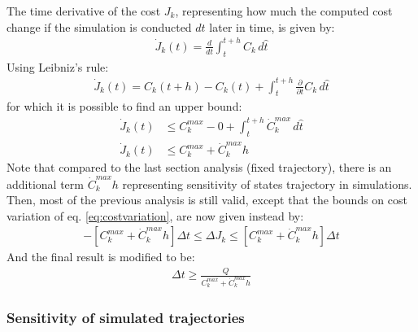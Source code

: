 The time derivative of the cost $J_k$, representing how much the computed cost change if the simulation is conducted $dt$ later in time, is given by:
%
\begin{align}
\dot{J}_k(t) = \frac{d}{dt} \int_{t}^{t+h}{  C_k \, d\hat{t} }
\end{align}
%
Using Leibniz's rule:
%
\begin{align}
\dot{J}_k(t) = C_k( t + h ) -  C_k( t ) +   \int_{t}^{t+h}{ \frac{\partial}{\partial t} C_k \, d\hat{t} }
\end{align}
%
for which it is possible to find an upper bound:
%
\begin{align}
\dot{J}_k(t) &\leq C_k^{max} -  0   +   \int_{t}^{t+h}{ \dot{C}_k^{max} \, d\hat{t} }  \\
\dot{J}_k(t) &\leq C_k^{max}  +   \dot{C}_k^{max} h
\end{align}
%
Note that compared to the last section analysis (fixed trajectory), there is an additional term  $\dot{C}_k^{max} h$ representing sensitivity of states trajectory in simulations. Then, most of the previous analysis is still valid, except that the bounds on cost variation of eq. \eqref{eq:costvariation}, are now given instead by:
%
\begin{align}
-\left[ C_k^{max}  +   \dot{C}_k^{max} h \right] \Delta t  \leq \Delta J_k \leq \left[ C_k^{max}  +   \dot{C}_k^{max} h \right] \Delta t
\label{eq:costvariationnew}
\end{align}
%
And the final result is modified to be:
%
\begin{align}
\Delta t \geq \frac{Q}{ C_k^{max}  +   \dot{C}_k^{max} h }
\end{align}
%

\subsubsection{Sensitivity of simulated trajectories}

